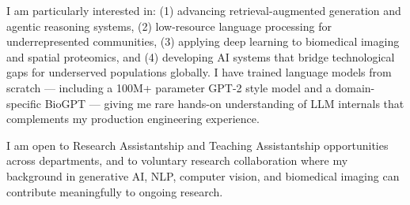\documentclass[11pt,a4paper]{article}
\begin{document}
I am particularly interested in: (1) advancing retrieval-augmented generation and agentic reasoning systems, (2) low-resource language processing for underrepresented communities, (3) applying deep learning to biomedical imaging and spatial proteomics, and (4) developing AI systems that bridge technological gaps for underserved populations globally. I have trained language models from scratch — including a 100M+ parameter GPT-2 style model and a domain-specific BioGPT — giving me rare hands-on understanding of LLM internals that complements my production engineering experience.

I am open to Research Assistantship and Teaching Assistantship opportunities across departments, and to voluntary research collaboration where my background in generative AI, NLP, computer vision, and biomedical imaging can contribute meaningfully to ongoing research.

\vspace{10pt}
\end{document}
